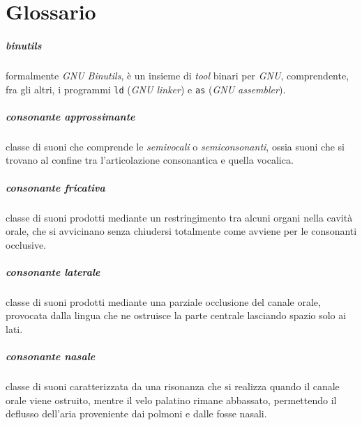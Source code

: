 

\cleardoublepage
\chapter{Glossario}

\paragraph{binutils}
  formalmente \textit{GNU Binutils}, è un insieme di \textit{tool} binari per \textit{GNU}, comprendente, fra
  gli altri, i programmi \texttt{ld} (\textit{GNU linker}) e \texttt{as} (\textit{GNU assembler}).
\label{glo:binu}


\paragraph{consonante approssimante}
\label{glo:consappr}
   classe di suoni che comprende le \textit{semivocali} o \textit{semiconsonanti}, ossia suoni che
   si trovano al confine tra l'articolazione consonantica e quella vocalica.

\paragraph{consonante fricativa}
\label{glo:consfric}
   classe di suoni prodotti mediante un restringimento tra alcuni organi nella cavità orale, che si avvicinano
   senza chiudersi totalmente come avviene per le consonanti occlusive.

\paragraph{consonante laterale}
\label{glo:conslate}
   classe di suoni prodotti mediante una parziale occlusione del canale orale, provocata dalla lingua che
   ne ostruisce la parte centrale lasciando spazio solo ai lati.

\paragraph{consonante nasale}
\label{glo:consnasa}
  classe di suoni caratterizzata da una risonanza che si realizza quando il canale orale viene ostruito, mentre il velo
  palatino rimane abbassato, permettendo il deflusso dell'aria proveniente dai polmoni e dalle fosse nasali.

